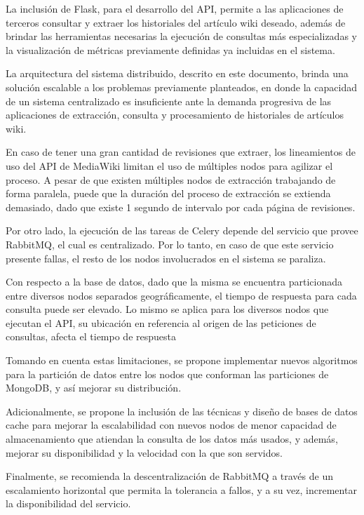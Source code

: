 La inclusión de Flask, para el desarrollo del API, permite a las aplicaciones de terceros consultar y extraer
los historiales del artículo wiki deseado, además de brindar las herramientas necesarias la ejecución
de consultas más especializadas y la visualización de métricas previamente definidas ya incluidas en el sistema.

La arquitectura del sistema distribuido, descrito en este documento, brinda
una solución escalable a los problemas previamente planteados, en donde la capacidad
de un sistema centralizado es insuficiente ante la demanda progresiva de las aplicaciones de
extracción, consulta y procesamiento de historiales de artículos wiki.

En caso de tener una gran cantidad de revisiones que extraer, los lineamientos de uso del API de MediaWiki limitan el uso de múltiples nodos para agilizar el proceso.
A pesar de que existen múltiples nodos de extracción trabajando de forma paralela, puede que la duración del proceso de extracción se extienda demasiado, dado que existe 1 segundo de intervalo por cada página de revisiones.

Por otro lado, la ejecución de las tareas de Celery depende del servicio que provee RabbitMQ, el cual es centralizado.
Por lo tanto, en caso de que este servicio presente fallas, el resto de los nodos involucrados en el sistema se paraliza.

Con respecto a la base de datos, dado que la misma se encuentra particionada entre diversos nodos separados geográficamente, el tiempo de respuesta para cada consulta puede ser elevado.
Lo mismo se aplica para los diversos nodos que ejecutan el API, su ubicación en referencia al origen de las peticiones de consultas, afecta el tiempo de respuesta

Tomando en cuenta estas limitaciones, se propone implementar nuevos algoritmos para la partición de datos entre los nodos que conforman las particiones de MongoDB, y así mejorar su distribución.

Adicionalmente, se propone la inclusión de las técnicas y diseño de bases de datos cache para mejorar la escalabilidad con nuevos nodos de menor capacidad de almacenamiento que atiendan la consulta de los datos más usados, y además, mejorar su disponibilidad y la velocidad con la que son servidos.

Finalmente, se recomienda la descentralización de RabbitMQ a través de un escalamiento horizontal que permita la tolerancia a fallos, y a su vez, incrementar la disponibilidad del servicio.
